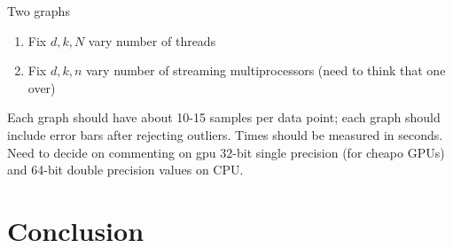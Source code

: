 \documentclass{article}
\begin{document}
Two graphs

\begin{enumerate}
	\item Fix $d, k, N$ vary number of threads
	\item Fix $d, k, n$ vary number of streaming multiprocessors (need to think that one over)
\end{enumerate}

Each graph should have about 10-15 samples per data point; each graph should include error bars after rejecting outliers. Times should be measured in seconds. Need to decide on commenting on gpu 32-bit single precision (for cheapo GPUs) and 64-bit double precision values on CPU.

\section{Conclusion}



\end{document}
